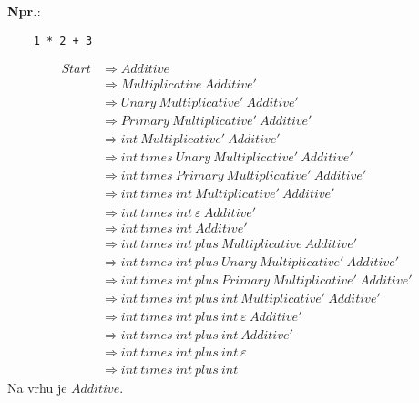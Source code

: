 \documentclass{report}
\newcommand{\Ex}{\textbf{Npr.}:\ }
\newcommand{\Null}{\varepsilon}
\newcommand{\Spc}{\ }
\newlength{\arrow}
\newcommand{\Derive}{\Rightarrow}
\newcommand{\NT}[1]{{#1}}
\newcommand{\T}[1]{{#1}}
\begin{document}
    \Ex
    \begin{lstlisting}
    1 * 2 + 3
    \end{lstlisting}
    \begin{equation*}
      \begin{aligned}
        \NT{Start} &\Derive \NT{Additive}\\
        &\Derive \NT{Multiplicative} \Spc \NT{Additive'}\\
        &\Derive \NT{Unary} \Spc \NT{Multiplicative'} \Spc \NT{Additive'}\\
        &\Derive \NT{Primary} \Spc \NT{Multiplicative'} \Spc \NT{Additive'}\\
        &\Derive \T{int} \Spc \NT{Multiplicative'} \Spc \NT{Additive'}\\
        &\Derive \T{int} \Spc \T{times} \Spc \NT{Unary} \Spc \NT{Multiplicative'} \Spc \NT{Additive'}\\
        &\Derive \T{int} \Spc \T{times} \Spc \NT{Primary} \Spc \NT{Multiplicative'} \Spc \NT{Additive'}\\
        &\Derive \T{int} \Spc \T{times} \Spc \T{int} \Spc \NT{Multiplicative'} \Spc \NT{Additive'}\\
        &\Derive \T{int} \Spc \T{times} \Spc \T{int} \Spc \Null \Spc \NT{Additive'}\\
        &\Derive \T{int} \Spc \T{times} \Spc \T{int} \Spc \NT{Additive'}\\
        &\Derive \T{int} \Spc \T{times} \Spc \T{int} \Spc \T{plus} \Spc \NT{Multiplicative} \Spc \NT{Additive'}\\
        &\Derive \T{int} \Spc \T{times} \Spc \T{int} \Spc \T{plus} \Spc \NT{Unary} \Spc \NT{Multiplicative'} \Spc \NT{Additive'}\\
        &\Derive \T{int} \Spc \T{times} \Spc \T{int} \Spc \T{plus} \Spc \NT{Primary} \Spc \NT{Multiplicative'} \Spc \NT{Additive'}\\
        &\Derive \T{int} \Spc \T{times} \Spc \T{int} \Spc \T{plus} \Spc \T{int} \Spc \NT{Multiplicative'} \Spc \NT{Additive'}\\
        &\Derive \T{int} \Spc \T{times} \Spc \T{int} \Spc \T{plus} \Spc \T{int} \Spc \Null \Spc \NT{Additive'}\\
        &\Derive \T{int} \Spc \T{times} \Spc \T{int} \Spc \T{plus} \Spc \T{int} \Spc \NT{Additive'}\\
        &\Derive \T{int} \Spc \T{times} \Spc \T{int} \Spc \T{plus} \Spc \T{int} \Spc \Null\\
        &\Derive \T{int} \Spc \T{times} \Spc \T{int} \Spc \T{plus} \Spc \T{int}
      \end{aligned}
    \end{equation*}
    Na vrhu je $\NT{Additive}$.
\end{document}
